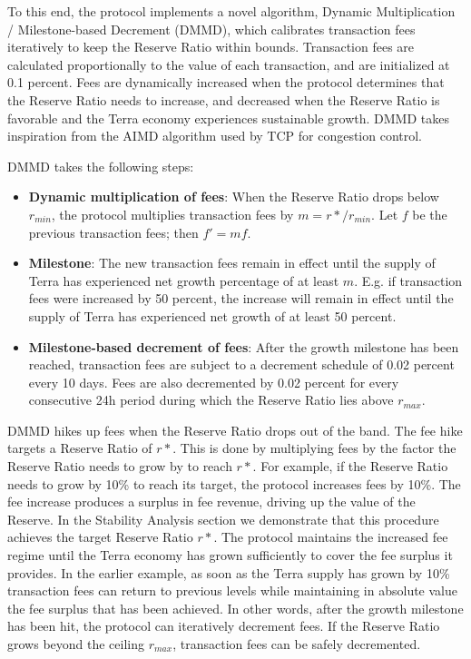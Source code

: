 \documentclass{article}
\begin{document}
To this end, the protocol implements a novel algorithm, Dynamic Multiplication / Milestone-based Decrement (DMMD), which calibrates transaction fees iteratively to keep the Reserve Ratio within bounds. Transaction fees are calculated proportionally to the value of each transaction, and are initialized at 0.1 percent. Fees are dynamically increased when the protocol determines that the Reserve Ratio needs to increase, and decreased when the Reserve Ratio is favorable and the Terra economy experiences sustainable growth. DMMD takes inspiration from the AIMD algorithm used by TCP for congestion control.

DMMD takes the following steps:

\begin{itemize}
    \item \textbf{Dynamic multiplication of fees}: When the Reserve Ratio drops below $r_{min}$, the protocol multiplies transaction fees by $m = {r*}/r_{min}$. Let $f$ be the previous transaction fees; then $f' = mf$.
    
    \item \textbf{Milestone}: The new transaction fees remain in effect until the supply of Terra has experienced net growth percentage of at least $m$. E.g. if transaction fees were increased by 50 percent, the increase will remain in effect until the supply of Terra has experienced net growth of at least 50 percent.
    
    \item \textbf{Milestone-based decrement of fees}: After the growth milestone has been reached, transaction fees are subject to a decrement schedule of 0.02 percent every 10 days. Fees are also decremented by 0.02 percent for every consecutive 24h period during which the Reserve Ratio lies above $r_{max}$.
\end{itemize}

DMMD hikes up fees when the Reserve Ratio drops out of the band. The fee hike targets a Reserve Ratio of $r*$. This is done by multiplying fees by the factor the Reserve Ratio needs to grow by to reach $r*$. For example, if the Reserve Ratio needs to grow by 10\% to reach its target, the protocol increases fees by 10\%. The fee increase produces a surplus in fee revenue, driving up the value of the Reserve. In the Stability Analysis section we demonstrate that this procedure achieves the target Reserve Ratio $r*$. The protocol maintains the increased fee regime until the Terra economy has grown sufficiently to cover the fee surplus it provides. In the earlier example, as soon as the Terra supply has grown by 10\% transaction fees can return to previous levels while maintaining in absolute value the fee surplus that has been achieved. In other words, after the growth milestone has been hit, the protocol can iteratively decrement fees. If the Reserve Ratio grows beyond the ceiling $r_{max}$, transaction fees can be safely decremented.
\end{document}
